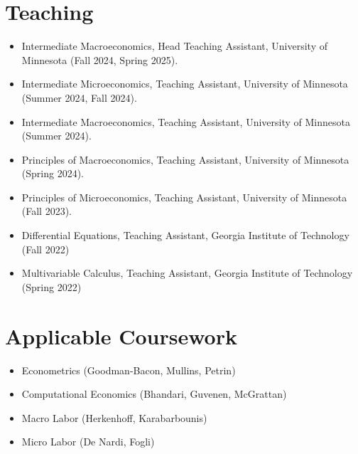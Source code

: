 \documentclass{cv_style}
\begin{document}
	\section{Teaching}
	\begin{itemize}
			\item Intermediate Macroeconomics, Head Teaching Assistant, University of Minnesota (Fall 2024, Spring 2025).
			\item Intermediate Microeconomics, Teaching Assistant, University of Minnesota (Summer 2024, Fall 2024).
			\item Intermediate Macroeconomics, Teaching Assistant, University of Minnesota (Summer 2024).
   			\item Principles of Macroeconomics, Teaching Assistant, University of Minnesota (Spring 2024).
      			\item Principles of Microeconomics, Teaching Assistant, University of Minnesota (Fall 2023).
         \item Differential Equations, Teaching Assistant, Georgia Institute of Technology (Fall 2022)
         \item Multivariable Calculus, Teaching Assistant, Georgia Institute of Technology (Spring 2022)
		\end{itemize}
		
	\section{Applicable Coursework}
		\begin{itemize}
			\item Econometrics (Goodman-Bacon, Mullins, Petrin)
   \item Computational Economics (Bhandari, Guvenen, McGrattan)
   \item Macro Labor (Herkenhoff, Karabarbounis)
   \item Micro Labor (De Nardi, Fogli)
		\end{itemize}
\end{document}
